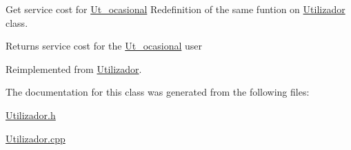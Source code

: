 Get service cost for \hyperlink{class_ut__ocasional}{Ut\+\_\+ocasional} Redefinition of the same funtion on \hyperlink{class_utilizador}{Utilizador} class. 

\begin{DoxyReturn}{Returns}
service cost for the \hyperlink{class_ut__ocasional}{Ut\+\_\+ocasional} user 
\end{DoxyReturn}


Reimplemented from \hyperlink{class_utilizador_a988e8a7c0cc0625866350a476a5d7b62}{Utilizador}.



The documentation for this class was generated from the following files\+:\begin{DoxyCompactItemize}
\item 
\hyperlink{_utilizador_8h}{Utilizador.\+h}\item 
\hyperlink{_utilizador_8cpp}{Utilizador.\+cpp}\end{DoxyCompactItemize}
